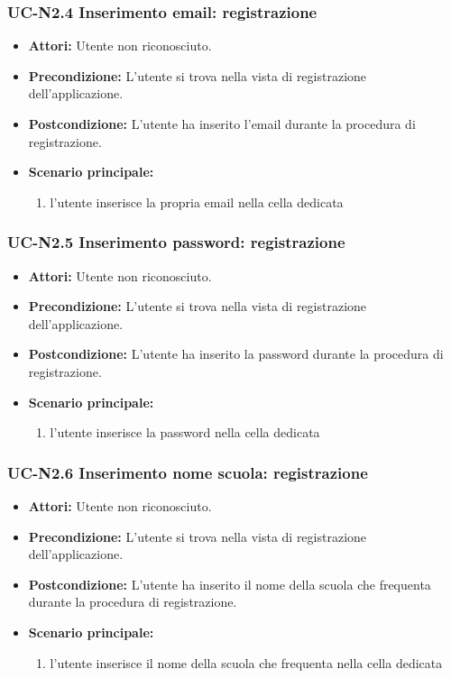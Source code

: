 \subsubsection{UC-N2.4 Inserimento email: registrazione}
\begin{itemize}
	\item \textbf{Attori: }Utente non riconosciuto.
	\item \textbf{Precondizione: }L'utente si trova nella vista 		di registrazione dell'applicazione.
	\item \textbf{Postcondizione: }L'utente ha inserito l'email durante la procedura di registrazione.
	\item \textbf{Scenario principale: }
	\begin{enumerate}
		\item l'utente inserisce la propria email nella cella dedicata
	\end{enumerate}
\end{itemize}

\subsubsection{UC-N2.5 Inserimento password: registrazione}
\begin{itemize}
	\item \textbf{Attori: }Utente non riconosciuto.
	\item \textbf{Precondizione: }L'utente si trova nella vista 		di registrazione dell'applicazione.
	\item \textbf{Postcondizione: }L'utente ha inserito la password durante la procedura di registrazione.
	\item \textbf{Scenario principale: }
	\begin{enumerate}
		\item l'utente inserisce la password nella cella dedicata
	\end{enumerate}
\end{itemize}

\subsubsection{UC-N2.6 Inserimento nome scuola: registrazione}
\begin{itemize}
	\item \textbf{Attori: }Utente non riconosciuto.
	\item \textbf{Precondizione: }L'utente si trova nella vista 		di registrazione dell'applicazione.
	\item \textbf{Postcondizione: }L'utente ha inserito il nome della scuola che frequenta durante la procedura di registrazione.
	\item \textbf{Scenario principale: }
	\begin{enumerate}
		\item l'utente inserisce il nome della scuola che frequenta nella cella dedicata
	\end{enumerate}
\end{itemize}

